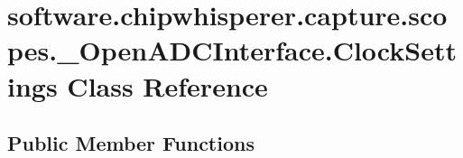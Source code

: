 \hypertarget{classsoftware_1_1chipwhisperer_1_1capture_1_1scopes_1_1__OpenADCInterface_1_1ClockSettings}{}\section{software.\+chipwhisperer.\+capture.\+scopes.\+\_\+\+Open\+A\+D\+C\+Interface.\+Clock\+Settings Class Reference}
\label{classsoftware_1_1chipwhisperer_1_1capture_1_1scopes_1_1__OpenADCInterface_1_1ClockSettings}
\subsection*{Public Member Functions}
